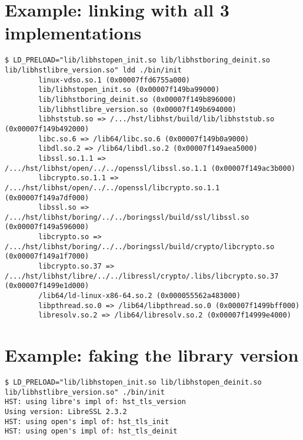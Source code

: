 \documentclass{acm_proc_article-sp}
\begin{document}
\section{Example: linking with all 3 implementations}\label{Ex:ex1}
\begin{verbatim}
$ LD_PRELOAD="lib/libhstopen_init.so lib/libhstboring_deinit.so lib/libhstlibre_version.so" ldd ./bin/init
        linux-vdso.so.1 (0x00007ffd6755a000)
        lib/libhstopen_init.so (0x00007f149ba99000)
        lib/libhstboring_deinit.so (0x00007f149b896000)
        lib/libhstlibre_version.so (0x00007f149b694000)
        libhststub.so => /.../hst/libhst/build/lib/libhststub.so (0x00007f149b492000)
        libc.so.6 => /lib64/libc.so.6 (0x00007f149b0a9000)
        libdl.so.2 => /lib64/libdl.so.2 (0x00007f149aea5000)
        libssl.so.1.1 => /.../hst/libhst/open/../../openssl/libssl.so.1.1 (0x00007f149ac3b000)
        libcrypto.so.1.1 => /.../hst/libhst/open/../../openssl/libcrypto.so.1.1 (0x00007f149a7df000)
        libssl.so => /.../hst/libhst/boring/../../boringssl/build/ssl/libssl.so (0x00007f149a596000)
        libcrypto.so => /.../hst/libhst/boring/../../boringssl/build/crypto/libcrypto.so (0x00007f149a1f7000)
        libcrypto.so.37 => /.../hst/libhst/libre/../../libressl/crypto/.libs/libcrypto.so.37 (0x00007f1499e1d000)
        /lib64/ld-linux-x86-64.so.2 (0x000055562a483000)
        libpthread.so.0 => /lib64/libpthread.so.0 (0x00007f1499bff000)
        libresolv.so.2 => /lib64/libresolv.so.2 (0x00007f14999e4000)
\end{verbatim}

\section{Example: faking the library version}\label{Ex:ex2}
\begin{verbatim}
$ LD_PRELOAD="lib/libhstopen_init.so lib/libhstopen_deinit.so lib/libhstlibre_version.so" ./bin/init
HST: using libre's impl of: hst_tls_version
Using version: LibreSSL 2.3.2
HST: using open's impl of: hst_tls_init
HST: using open's impl of: hst_tls_deinit
\end{verbatim}

\balancecolumns
\end{document}
